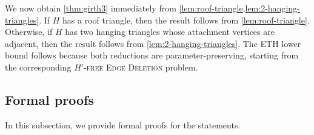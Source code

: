 \documentclass[a4paper,UKenglish,cleveref, autoref, thm-restate]{lipics-v2021}
\begin{document}
We now obtain \cref{thm:girth3} immediately from \cref{lem:roof-triangle,lem:2-hanging-triangles}.
If $H$ has a roof triangle, then the result follows from \cref{lem:roof-triangle}.
Otherwise, if $H$ has two hanging triangles whose attachment vertices are adjacent, then the result follows from \cref{lem:2-hanging-triangles}.
The ETH lower bound follows because both reductions are parameter-preserving, starting from the corresponding \textsc{$H'$-free Edge Deletion} problem.

\subsection{Formal proofs}
In this subsection, we provide formal proofs for the statements.

\RoofTriangleLemma*
\end{document}
